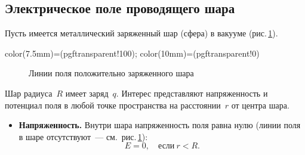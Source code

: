 \documentclass[main.tex]{subfiles}
\begin{document}

\pagestyle{empty}

\begin{NoHyper} %

\setcounter{section}{13
}
\addtocounter{section}{-1} 

\section{Электрическое поле проводящего шара}


Пусть имеется металлический заряженный шар (сфера) в вакууме (рис.\,\ref{fig:p111}).

\tikzfading[name=fade out,
inner color=transparent!0,
outer color=transparent!100]

{
color(7.5mm)=(pgftransparent!100);
color(10mm)=(pgftransparent!0)
}

    \begin{figure}[H]
    \centering

\caption{Линии поля положительно заряженного шара}
\label{fig:p111}
\end{figure}


Шар радиуса~$R$ имеет заряд~$q$. Интерес представляют напряженность и потенциал поля в любой точке пространства на расстоянии~$r$ от центра шара. 
\begin{itemize}
    \item \textbf{Напряженность.} Внутри шара напряженность поля равна нулю (линии поля в шаре отсутствуют~--- см.~рис.\,\ref{fig:p111}):
    \begin{equation}
    \label{e32}
    E=0,\quad \text{если}\ r<R.
    \end{equation}


\end{itemize}
\end{NoHyper}
\end{document}

